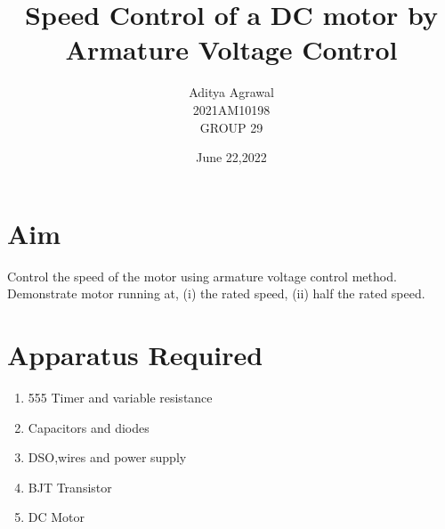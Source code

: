 \documentclass{article}
\title{Speed Control of a DC motor by Armature Voltage Control}
\author{Aditya Agrawal\\2021AM10198\\GROUP 29}
\date{June 22,2022}
\begin{document}
\maketitle
\tableofcontents
{}
\newpage

\section{Aim}
Control the speed of the motor using armature voltage control method. Demonstrate motor running at, (i) the rated speed, (ii) half the rated speed.

\section{Apparatus Required}
\begin{enumerate}
    \item 555 Timer and variable resistance
    \item Capacitors and diodes
    \item DSO,wires and power supply
    \item BJT Transistor
    \item DC Motor
\end{enumerate}
\end{document}
